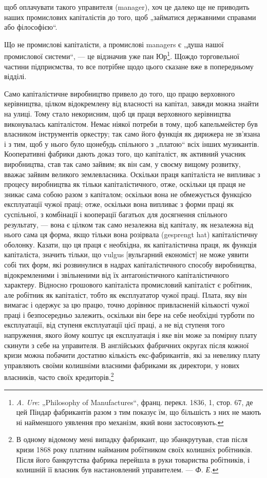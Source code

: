 \parcont{}  %
щоб оплачувати такого управителя (manager), хоч це далеко
ще не приводить наших промислових капіталістів до того, щоб
„займатися державними справами або філософією“.

Що не промислові капіталісти, а промислові managers є „душа
нашої промислової системи“, — це відзначив уже пан Юр\footnote{
\emph{A. Ure}: „Philosophy of Manufactures“, франц. перекл. 1836, 1, стор. 67,
де цей Піндар фабрикантів разом з тим показує їм, що більшість з них не
мають ні найменшого уявлення про механізм, який вони застосовують.
}.
Щождо торговельної частини підприємства, то все потрібне
щодо цього сказане вже в попередньому відділі.

Само капіталістичне виробництво привело до того, що працю
верховного керівництва, цілком відокремлену від власності на капітал,
завжди можна знайти на улиці. Тому стало некорисним, щоб ця
праця верховного керівництва виконувалась капіталістом. Немає
ніякої потреби в тому, щоб капельмейстер був власником інструментів
оркестру; так само його функція як дирижера не зв’язана і з тим,
щоб у нього було щонебудь спільного з „платою“ всіх інших музикантів.
Кооперативні фабрики дають доказ того, що капіталіст, як
активний учасник виробництва, став так само зайвим; як він сам,
у своєму вищому розвитку, вважає зайвим великого землевласника.
Оскільки праця капіталіста не випливає з процесу виробництва
як тільки капіталістичного, отже, оскільки ця праця не
зникає сама собою разом з капіталом; оскільки вона не обмежується
функцією експлуатації чужої праці; отже, оскільки вона
випливає з форми праці як суспільної, з комбінації і кооперації
багатьох для досягнення спільного результату, — вона є цілком так
само незалежна від капіталу, як незалежна від нього сама ця форма,
якщо тільки вона розірвала (gesprengt hat) капіталістичну оболонку.
Казати, що ця праця є необхідна, як капіталістична праця,
як функція капіталіста, значить тільки, що vulgus [вульгарний
економіст] не може уявити собі тих форм, які розвинулися
в надрах капіталістичного способу виробництва, відокремленими
і звільненими від їх антагоністичного капіталістичного характеру.
Відносно грошового капіталіста промисловий капіталіст
є робітник, але робітник як капіталіст, тобто як експлуататор
чужої праці. Плата, яку він вимагає і одержує за цю працю,
точно дорівнює привласненій кількості чужої праці і безпосередньо
залежить, оскільки він бере на себе необхідні турботи по
експлуатації, від ступеня експлуатації цієї праці, а не від ступеня
того напруження, якого йому коштує ця експлуатація і яке він може
за помірну плату скинути з себе на управителя. В англійських
фабричних округах після кожної кризи можна побачити достатню
кількість екс-фабрикантів, які за невелику плату управляють
своїми колишніми власними фабриками як директори, у нових власників,
часто своїх кредиторів.\footnote{
В одному відомому мені випадку фабрикант, що збанкрутував, став після
кризи 1868 року платним найманим робітником своїх колишніх робітників. Після
його банкрутства фабрика перейшла в руки товариства робітників, і колишній
її власник був настановлений управителем. — \emph{Ф. Е.}
}
